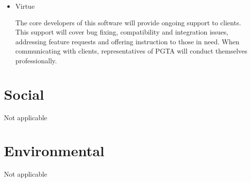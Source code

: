 \documentclass{tufte-handout}
\begin{document}
\begin{itemize}

\item Virtue

The core developers of this software will provide ongoing support to clients. This support will cover bug fixing, 
compatibility and integration issues, addressing feature requests and offering instruction to those in need. When 
communicating with clients, representatives of PGTA will conduct themselves professionally.

\end{itemize}

\newpage
\section{Social}

Not applicable

\section{Environmental} 

Not applicable



\end{document}
